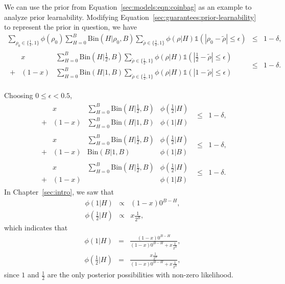 \begin{example}

We can use the prior from Equation~\ref{sec:models:eqn:coinbag} as an example to analyze prior learnability. Modifying Equation~\ref{sec:guarantees:prior-learnability} to represent the prior in question, we have
\begin{eqnarray}
\label{sec:guarantees:coin-bag-learnability}
\sum_{\rho_0 \in \{\frac 1 2, 1\}}
 \phi(\rho_0)
 \sum_{H=0}^B
  \mbox{Bin}(H|\rho_0,B)
  \sum_{\tilde \rho \in \{\frac 1 2, 1\}}
   \phi(\rho|H)
   \mathbb{1}(|\rho_0-\tilde\rho|\leq\epsilon)
&\leq& 1-\delta,\\
%
\begin{array}{lrl}
&x&
 \sum_{H=0}^B
  \mbox{Bin}(H|\frac 1 2,B)
  \sum_{\tilde \rho \in \{\frac 1 2, 1\}}
   \phi(\rho|H)
   \mathbb{1}(|\frac 1 2-\tilde\rho|\leq\epsilon)\\ 
+&(1-x)&
 \sum_{H=0}^B
  \mbox{Bin}(H|1,B)
  \sum_{\tilde \rho \in \{\frac 1 2, 1\}}
   \phi(\rho|H)
   \mathbb{1}(|1-\tilde\rho|\leq\epsilon)
\end{array}
&\leq& 1-\delta.
\end{eqnarray}

Choosing $0 \leq \epsilon < 0.5$,
\begin{eqnarray}
%
\begin{array}{lrll}
&x&
 \sum_{H=0}^B
  \mbox{Bin}(H|\frac 1 2,B)&
   \phi(\frac 1 2|H)\\ 
+&(1-x)&
 \sum_{H=0}^B
  \mbox{Bin}(H|1,B)&
   \phi(1|H)
\end{array}
&\leq& 1-\delta,\\
%
\begin{array}{lrll}
&x&
 \sum_{H=0}^B
  \mbox{Bin}(H|\frac 1 2,B)&
   \phi(\frac 1 2|H)\\ 
+&(1-x)&
  \mbox{Bin}(B|1,B)&
   \phi(1|B)
\end{array}
&\leq& 1-\delta,\\
%
\label{sec:guarantees:coinbag-learnability-leaveoff}
\begin{array}{lrll}
&x&
 \sum_{H=0}^B
  \mbox{Bin}(H|\frac 1 2,B)&
   \phi(\frac 1 2|H)\\ 
+&(1-x)&
  &
   \phi(1|B)
\end{array}
&\leq& 1-\delta.
\end{eqnarray}
%
%
In Chapter~\ref{sec:intro}, we saw that
\begin{eqnarray}
\phi(1|H) &\propto& (1-x)0^{B-H},\\
\phi(\frac 1 2|H) &\propto& x \frac 1 {2^B},
\end{eqnarray}
which indicates that
\begin{eqnarray}
\phi(1|H) &=& \frac
{(1-x)0^{B-H}}
{(1-x)0^{B-H}+x \frac 1 {2^B}},\\
\phi(\frac 1 2|H) &=& \frac
{x \frac 1 {2^B}}
{(1-x)0^{B-H}+x \frac 1 {2^B}},
\end{eqnarray}
since $1$ and $\frac 1 2$ are the only posterior possibilities with non-zero likelihood.



\end{example}

